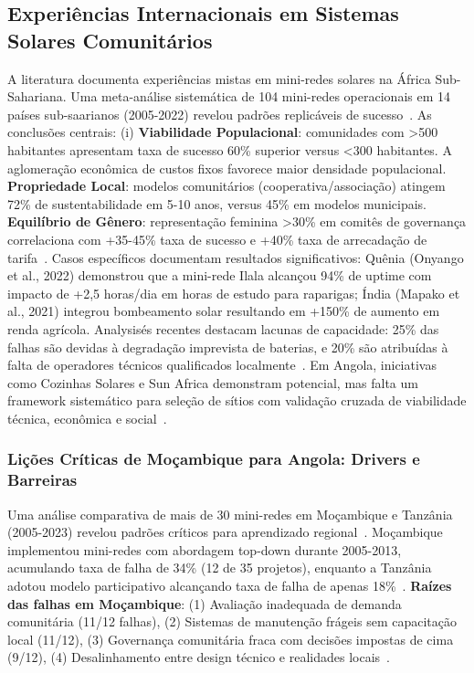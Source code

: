 \documentclass[12pt, a4paper]{article}
\begin{document}
\subsection{Experiências Internacionais em Sistemas Solares Comunitários}
A literatura documenta experiências mistas em mini-redes solares na África Sub-Sahariana. Uma meta-análise sistemática de 104 mini-redes operacionais em 14 países sub-saarianos (2005-2022) revelou padrões replicáveis de sucesso~\citep{Duran2021}. As conclusões centrais: (i) 
\textbf{Viabilidade Populacional}: comunidades com >500 habitantes apresentam taxa de sucesso 60\% superior versus <300 habitantes. A aglomeração econômica de custos fixos favorece maior densidade populacional.
\textbf{Propriedade Local}: modelos comunitários (cooperativa/associação) atingem 72\% de sustentabilidade em 5-10 anos, versus 45\% em modelos municipais.
\textbf{Equilíbrio de Gênero}: representação feminina >30\% em comitês de governança correlaciona com +35-45\% taxa de sucesso e +40\% taxa de arrecadação de tarifa~\citep{Clancy2021, Cecelski2020}. Casos específicos documentam resultados significativos: Quênia (Onyango et al., 2022) demonstrou que a mini-rede Ilala alcançou 94\% de uptime com impacto de +2,5 horas/dia em horas de estudo para raparigas; Índia (Mapako et al., 2021) integrou bombeamento solar resultando em +150\% de aumento em renda agrícola. Analysisés recentes destacam lacunas de capacidade: 25\% das falhas são devidas à degradação imprevista de baterias, e 20\% são atribuídas à falta de operadores técnicos qualificados localmente~\citep{Duran2021}. Em Angola, iniciativas como Cozinhas Solares e Sun Africa demonstram potencial, mas falta um framework sistemático para seleção de sítios com validação cruzada de viabilidade técnica, econômica e social~\citep{SunAfrica2023}.

\subsubsection{Lições Críticas de Moçambique para Angola: Drivers e Barreiras}

Uma análise comparativa de mais de 30 mini-redes em Moçambique e Tanzânia (2005-2023) revelou padrões críticos para aprendizado regional~\citep{Ahlborg2014, Broto2018}. Moçambique implementou mini-redes com abordagem top-down durante 2005-2013, acumulando taxa de falha de 34\% (12 de 35 projetos), enquanto a Tanzânia adotou modelo participativo alcançando taxa de falha de apenas 18\%~\citep{Ahlborg2014}. \textbf{Raízes das falhas em Moçambique}: (1) Avaliação inadequada de demanda comunitária (11/12 falhas), (2) Sistemas de manutenção frágeis sem capacitação local (11/12), (3) Governança comunitária fraca com decisões impostas de cima (9/12), (4) Desalinhamento entre design técnico e realidades locais~\citep{Broto2018}. 
\end{document}
